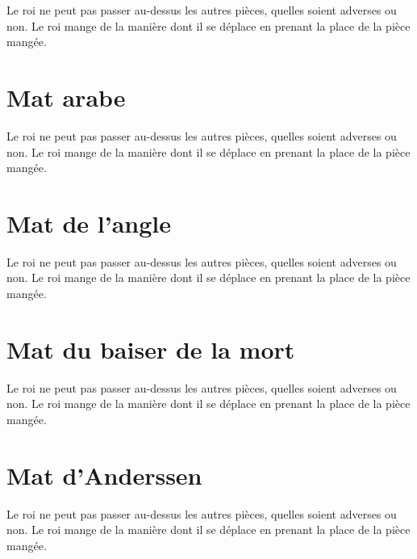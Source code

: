 \documentclass[a5paper,openany,twocolumn]{book}%
\begin{document}
Le roi ne peut pas passer au-dessus les autres pièces, quelles soient adverses ou non. Le roi mange de la manière dont il se déplace en prenant la place de la pièce mangée. 


\chapter{Mat arabe}
 
Le roi ne peut pas passer au-dessus les autres pièces, quelles soient adverses ou non. Le roi mange de la manière dont il se déplace en prenant la place de la pièce mangée. 


\chapter{Mat de l'angle}

Le roi ne peut pas passer au-dessus les autres pièces, quelles soient adverses ou non. Le roi mange de la manière dont il se déplace en prenant la place de la pièce mangée. 


\chapter{Mat du baiser de la mort}

Le roi ne peut pas passer au-dessus les autres pièces, quelles soient adverses ou non. Le roi mange de la manière dont il se déplace en prenant la place de la pièce mangée. 


\chapter{Mat d'Anderssen}
 
Le roi ne peut pas passer au-dessus les autres pièces, quelles soient adverses ou non. Le roi mange de la manière dont il se déplace en prenant la place de la pièce mangée. 
\end{document}
